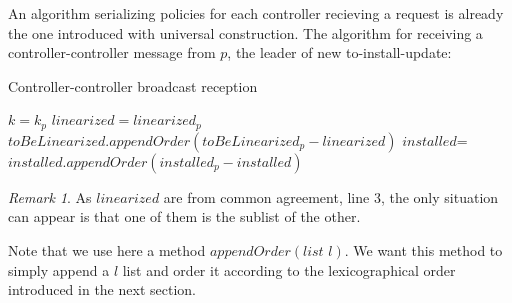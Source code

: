 \documentclass{article}
\theoremstyle{remark}
\newtheorem*{remark}{Remark}
\begin{document}
%
An algorithm serializing policies for each controller recieving a request is already the one introduced with universal construction.
The algorithm for receiving a controller-controller message from $p$, the leader of new to-install-update:
\begin{algorithm}
\caption{Controller-controller broadcast reception}\label{BroadcastCC}
  \begin{algorithmic}[1]
     $k=k_p$
    \EndIf
     $linearized = linearized_p$
    \EndIf
    \State $toBeLinearized.appendOrder(toBeLinearized_p-linearized)$
    \State $installed$=$installed.appendOrder(installed_p-installed)$
    \EndProcedure
  \end{algorithmic}
\end{algorithm}
\begin{remark}
As $linearized$ are from common agreement, line 3, the only situation can appear is that one of them is the sublist of the other.
\end{remark}
Note that we use here a method $appendOrder(\textit{list } l)$. We want this method to simply append a $l$ list and order it according to the lexicographical order introduced in the next section.
%

%
\end{document}

